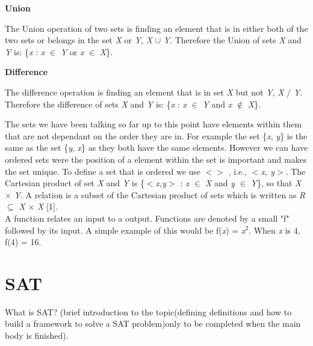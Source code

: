 \documentclass[11pt,a4paper]{report}
\begin{document}
\textbf{Union}

\indent The Union operation of two sets is finding an element that is in either both of the two sets or belongs in the set \textit{X} or \textit{Y}, \textit{X} $\cup$ \textit{Y}. Therefore the Union of sets \textit{X} and \textit{Y} is: \{\textit{x} : \textit{x} $\in$ \textit{Y} or \textit{x} $\in$ \textit{X}\}. 

\textbf{Difference}

\indent The difference operation is finding an element that is in set \textit{X} but not \textit{Y}, \textit{X} / \textit{Y}. Therefore the difference of sets \textit{X} and \textit{Y} is: \{\textit{x} : \textit{x} $\in$ \textit{Y} and \textit{x} $\not \in$ \textit{X}\}.

The sets we have been talking so far up to this point have elements within them that are not dependant on the order they are in. For example the set \{\textit{x}, \textit{y}\} is the same as the set \{\textit{y}, \textit{x}\} as they both have the same elements. However we can have ordered sets were the position of a element within the set is important and makes the set unique. To define a set that is ordered we use $<> $ , i.e., $<$\textit{x, y}$>$. 
The Cartesian product of set \textit{X} and \textit{Y} is \{$<$\textit{x,y}$>$ : \textit{x} $\in$ \textit{X} and \textit{y} $\in$ \textit{Y}\}, so that \textit{X} $\times$ \textit{Y}.
A relation is a subset of the Cartesian product of sets which is written as \textit{R} $\subseteq$ \textit{X} $\times$ \textit{X} [1].\\

A function relates an input to a output. Functions are denoted by a small "f" followed by its input. A simple example of this would be f(\textit{x}) = \textit{x}$^2$. When \textit{x} is 4, f(4) = {16}.



\section{SAT}
\label{sec:SAT}

What is SAT? (brief introduction to the topic(defining definitions and how to build a framework to solve a SAT problem)only to be completed when the main body is finished).
\end{document}
